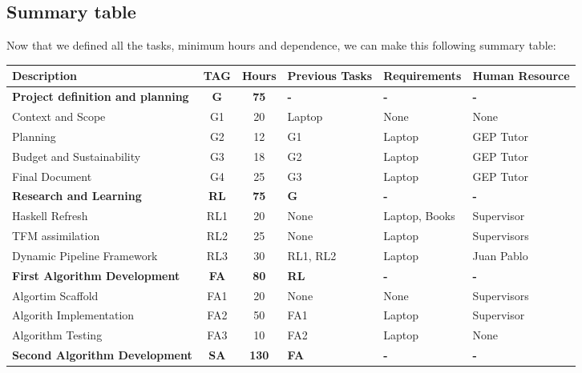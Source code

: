 \subsection{Summary table}
Now that we defined all the tasks, minimum hours and dependence, we can make this following summary table:
\begin{table}[H]
    \begin{adjustwidth}{-1in}{-1in}
    \centering
    \begin{tabular}{|p{5cm}|c|c|p{2cm}|p{3cm}|p{3cm}|}
    \hline
    \textbf{Description} & \textbf{TAG} & \textbf{Hours} & \textbf{Previous Tasks} & \textbf{Requirements} & \textbf{Human Resource} \\
    \hline
    \hline	
    \rowcolor{LightGray}
    \textbf{Project definition and planning} & \textbf{G} & \textbf{75} & \textbf{-} & \textbf{-} & \textbf{-}  \\
    \hline
    Context and Scope & G1 & 20 & Laptop & None & None \\
    \hline
    Planning & G2 & 12 & G1 & Laptop & GEP Tutor \\
    \hline
    Budget and Sustainability & G3 & 18 & G2 & Laptop & GEP Tutor \\
    \hline
    Final Document & G4 & 25 & G3 & Laptop & GEP Tutor \\
    \hline
    \hline
    \rowcolor{LightGray}
    \textbf{Research and Learning} & \textbf{RL} & \textbf{75} & \textbf{G} & \textbf{-} & \textbf{-} \\
    \hline
    Haskell Refresh & RL1 & 20 & None & Laptop, Books & Supervisor \\
    \hline
    TFM assimilation & RL2 & 25 & None & Laptop & Supervisors \\
    \hline
    Dynamic Pipeline Framework & RL3 & 30 & RL1, RL2 & Laptop & Juan Pablo \\
    \hline
    \hline
    \rowcolor{LightGray}
    \textbf{First Algorithm Development} & \textbf{FA} & \textbf{80} & \textbf{RL} & \textbf{-} & \textbf{-} \\
    \hline
    Algortim Scaffold & FA1 & 20 & None & None & Supervisors\\
    \hline
    Algorith Implementation & FA2 & 50 & FA1 & Laptop & Supervisor\\
    \hline
    Algorithm Testing & FA3 & 10 & FA2 & Laptop & None \\
    \hline
    \hline
    \rowcolor{LightGray}
    \textbf{Second Algorithm Development} & \textbf{SA} & \textbf{130} & \textbf{FA} & \textbf{-} & \textbf{-} \\

\end{tabular}
\end{adjustwidth}
\end{table}
